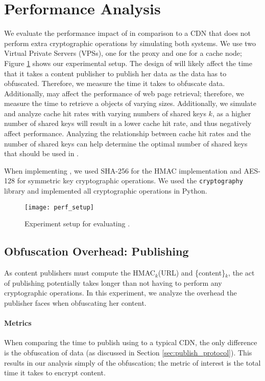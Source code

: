\section{Performance Analysis}
\label{sec:performance}

We evaluate the performance impact of \system{} in comparison to a CDN that does not perform extra cryptographic operations by simulating both systems.   
We use two Virtual Private Servers (VPSs), one for the proxy and one for a cache node; Figure \ref{fig:perf_setup} shows our 
experimental setup.  The design of \system{} will likely affect the time that it takes a content publisher to publish her data as
the data has to obfuscated.  Therefore, we measure the time it takes to obfuscate data.  Additionally, \system{} may affect the performance of web page retrieval; therefore, we measure the time to retrieve a objects of varying sizes.  Additionally, we simulate and analyze cache hit rates with varying numbers of 
shared keys $k$, as a higher number of shared keys will result in a lower cache hit rate, and thus negatively affect performance. Analyzing the relationship between cache hit
rates and the number of shared keys can help determine the optimal number of shared keys that should be used in \system{}.

When implementing \system{}, we used SHA-256 for the HMAC implementation and AES-128 for symmetric key cryptographic operations.  We used the {\tt cryptography} library and implemented 
all cryptographic operations in Python.  

\begin{figure}[h!]
\centering
\texttt{[image: perf\_setup]}
\caption{Experiment setup for evaluating \system{}.}
\label{fig:perf_setup}
\end{figure}

\subsection{Obfuscation Overhead: Publishing}
As content publishers must compute the HMAC$_k$(URL) and \{content\}$_k$, the act of publishing potentially 
takes longer than not having to perform any cryptographic operations.  In this experiment, we analyze the overhead 
the publisher faces when obfuscating her content.\\

\paragraph{Metrics}
When comparing the time to publish using \system{} to a typical CDN, the only difference is the obfuscation of 
data (as discussed in Section \ref{sec:publish_protocol}).  This results in our analysis simply of the 
obfuscation; the metric of interest is the total time it takes to encrypt content.  \\

